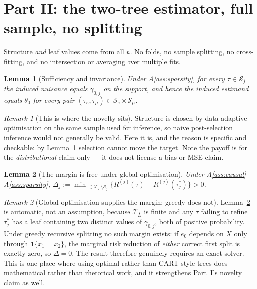\documentclass[11pt]{article}
\theoremstyle{plain}
\newtheorem{lemma}{Lemma}
\theoremstyle{definition}
\theoremstyle{remark}
\newtheorem{remark}{Remark}
\newcommand{\cT}{\mathcal{T}}
\newcommand{\cS}{\mathcal{S}}
\newcommand{\ez}{e_0}
\begin{document}
\section{Part II: the two-tree estimator, full sample, no splitting}

Structure \emph{and} leaf values come from all $n$. No folds, no sample
splitting, no cross-fitting, and no intersection or averaging over multiple fits.

\begin{lemma}[Sufficiency and invariance]\label{lem:invariance}
Under A\ref{ass:sparsity}, for every $\tau\in\cS_j$ the induced nuisance equals
$\gamma_{0,j}$ on the support, and hence the induced estimand equals $\theta_0$
for every pair $(\tau_e,\tau_\mu)\in\cS_e\times\cS_\mu$.
\end{lemma}

\begin{remark}[This is where the novelty sits]
Structure is chosen by data-adaptive optimisation on the same sample used for
inference, so naive post-selection inference would not generally be valid. Here
it is, and the reason is specific and checkable: by Lemma~\ref{lem:invariance}
selection cannot move the target. Note the payoff is for the
\emph{distributional} claim only --- it does not license a bias or MSE claim.
\end{remark}

\begin{lemma}[The margin is free under global optimisation]\label{lem:margin}
Under A\ref{ass:causal}--A\ref{ass:sparsity},
$\Delta_j:=\min_{\tau\in\cT_{\bar L}\setminus\cS_j}\{R^{(j)}(\tau)-R^{(j)}(\tau^*_j)\}>0$.
\end{lemma}

\begin{remark}[Global optimisation supplies the margin; greedy does not]
\label{rem:greedy}
Lemma~\ref{lem:margin} is automatic, not an assumption, because $\cT_{\bar L}$ is
finite and any $\tau$ failing to refine $\tau^*_j$ has a leaf containing two
distinct values of $\gamma_{0,j}$, both of positive probability. Under greedy
recursive splitting no such margin exists: if $\ez$ depends on $X$ only through
$\mathbf1\{x_1=x_2\}$, the marginal risk reduction of \emph{either} correct first
split is exactly zero, so $\Delta=0$. The result therefore genuinely requires an
exact solver. This is one place where using optimal rather than CART-style trees
does mathematical rather than rhetorical work, and it strengthens Part~I's
novelty claim as well.
\end{remark}
\end{document}
